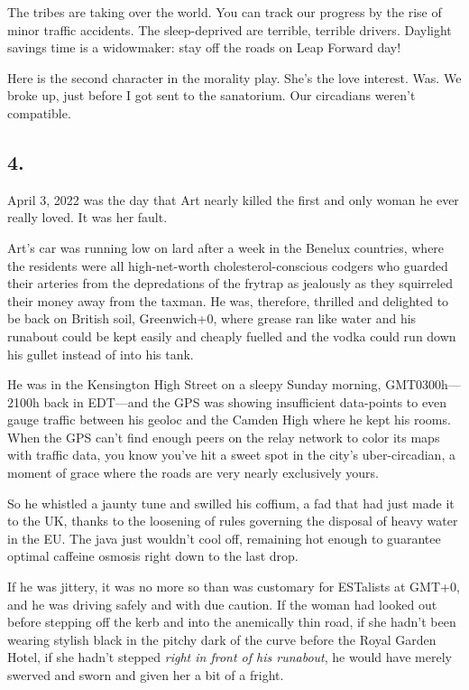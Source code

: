 The tribes are taking over the world. You can track our progress by
the rise of minor traffic accidents. The sleep-deprived are
terrible, terrible drivers. Daylight savings time is a widowmaker:
stay off the roads on Leap Forward day!

Here is the second character in the morality play. She’s the love
interest. Was. We broke up, just before I got sent to the
sanatorium. Our circadians weren’t compatible.

\subsection{4.}

April 3, 2022 was the day that Art nearly killed the first and only
woman he ever really loved. It was her fault.

Art’s car was running low on lard after a week in the Benelux
countries, where the residents were all high-net-worth
cholesterol-conscious codgers who guarded their arteries from the
depredations of the frytrap as jealously as they squirreled their
money away from the taxman. He was, therefore, thrilled and
delighted to be back on British soil, Greenwich+0, where grease ran
like water and his runabout could be kept easily and cheaply
fuelled and the vodka could run down his gullet instead of into his
tank.

He was in the Kensington High Street on a sleepy Sunday morning,
GMT0300h—2100h back in EDT—and the GPS was showing insufficient
data-points to even gauge traffic between his geoloc and the Camden
High where he kept his rooms. When the GPS can’t find enough peers
on the relay network to color its maps with traffic data, you know
you’ve hit a sweet spot in the city’s uber-circadian, a moment of
grace where the roads are very nearly exclusively yours.

So he whistled a jaunty tune and swilled his coffium, a fad that
had just made it to the UK, thanks to the loosening of rules
governing the disposal of heavy water in the EU. The java just
wouldn’t cool off, remaining hot enough to guarantee optimal
caffeine osmosis right down to the last drop.

If he was jittery, it was no more so than was customary for
ESTalists at GMT+0, and he was driving safely and with due caution.
If the woman had looked out before stepping off the kerb and into
the anemically thin road, if she hadn’t been wearing stylish black
in the pitchy dark of the curve before the Royal Garden Hotel, if
she hadn’t stepped \emph{right in front of his runabout}, he would
have merely swerved and sworn and given her a bit of a fright.

